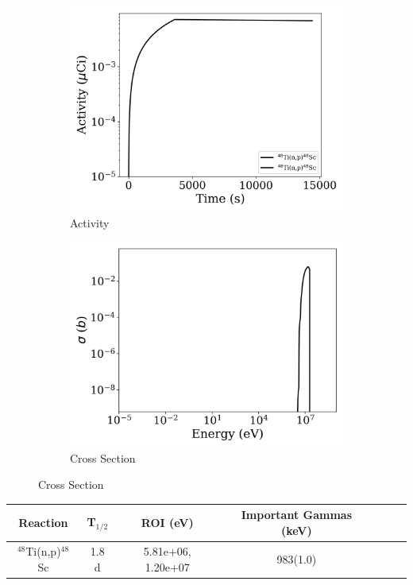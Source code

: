 \begin{figure}[h]
\centering
\begin{subfigure}{.5\textwidth}
  \centering
     \includegraphics[width=.8\textwidth]{plot/Ti-48(n,p)Sc-48_wisconsin1} 

  \caption{Activity}
\end{subfigure}%
\begin{subfigure}{.5\textwidth}
  \centering
     \includegraphics[width=.8\textwidth]{plot/Ti-48(n,p)Sc-48} 

  \caption{Cross Section}
\end{subfigure}
\end{figure}

\begin{table}[h]
\centering
\begin{tabular}{ |c|c|c|c|c|c|c| }
 \hline
 Reaction & T$_{1/2}$ & ROI (eV) & Important Gammas (keV) \\
 \hline 
 $^{48}$Ti(n,p)$^{48}$Sc &  1.8 d & 5.81e+06, 1.20e+07 & 983(1.0) \\ 
\hline
\end{tabular}
\end{table}
